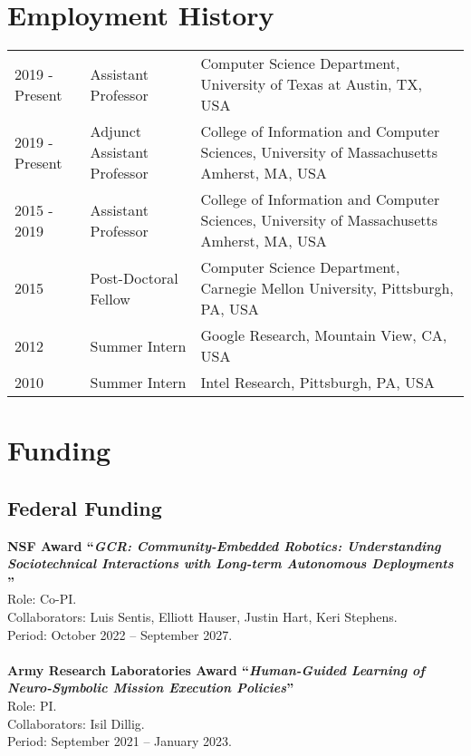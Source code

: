 \documentclass[Times]{article}
\newcommand{\funding}[1]{#1\\}
\renewcommand{\funding}[1]{\\}
\begin{document}

\section*{Employment History}
\begin{tabular}{ p{2cm} l p{8cm}}
  2019 - Present & Assistant Professor & Computer Science Department,
  University of Texas at Austin, TX, USA \\
  2019 - Present & Adjunct Assistant Professor &  College of Information and Computer Sciences, University of Massachusetts Amherst, MA, USA\\
  2015 - 2019  & Assistant Professor &  College of Information and Computer Sciences, University of Massachusetts Amherst, MA, USA\\
  2015 & Post-Doctoral Fellow &  Computer Science Department, Carnegie Mellon University, Pittsburgh, PA, USA\\
  2012 & Summer Intern &  Google Research, Mountain View, CA, USA\\
  2010 & Summer Intern &  Intel Research, Pittsburgh, PA, USA\\
\end{tabular}


\section*{Funding}

\subsection*{Federal Funding}

\textbf{NSF Award ``\emph{GCR: Community-Embedded Robotics: Understanding Sociotechnical Interactions with Long-term Autonomous Deployments
}''}\\
Role: Co-PI.\\
Collaborators: Luis Sentis, Elliott Hauser, Justin Hart, Keri Stephens.\\
Period: October 2022 -- September 2027.\\
\funding{Amount: \$3,600,000}

\textbf{Army Research Laboratories Award ``\emph{Human-Guided Learning of Neuro-Symbolic Mission Execution Policies}''}\\
Role: PI.\\
Collaborators: Isil Dillig.\\
Period: September 2021 -- January 2023.\\
\funding{Amount: \$372,798}
\end{document}
